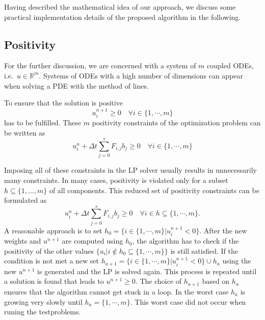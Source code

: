 \documentclass[a4paper]{article}
\numberwithin{equation}{section}
\theoremstyle{plain}
\theoremstyle{definition}
\numberwithin{theorem}{section}
\newcommand{\R}{\mathbb{R}}
\newcommand{\dt}{{\Delta t}}
\newcommand{\1}{\mathbbm{1}}
\begin{document}
Having described the mathematical idea of our approach,
we discuss some practical implementation details of the
proposed algorithm in the following.


\subsection{Positivity}

For the further discussion, we are concerned with a system of
$m$ coupled ODEs, i.e.\ $u \in \R^m$.
Systems of ODEs with a high number of dimensions can appear when solving a PDE with the method of lines.

To ensure that the solution is positive
\begin{equation}
 u_i^{n+1} \geq 0   \quad   \forall {i \in \{1, \cdots,m \}}  
\end{equation}
has to be fulfilled. These $m$ positivity constraints of the
optimization problem can be written as
\begin{equation}
u_i^n + \dt \sum_{j=0}^s F_{i,j}  b_j \geq 0 \quad \forall {i \in \{1, \cdots,m \}}
\end{equation}

Imposing all of these constraints in the LP solver usually results
in unnecessarily many constraints. In many cases, positivity is
violated only for a subset $h \subseteq \{1, \dots, m\}$ of all
components. This reduced set of positivity constraints can be
formulated as
\begin{equation}
u_i^n + \dt \sum_{j=0}^s F_{i,j}  b_j  \geq 0 \quad \forall i \in h \subseteq \{1,\cdots,m \}.
\end{equation}
A reasonable approach is to set $h_0 = \{ i \in \{1,\cdots,m \} |  u_i^{n+1}  < 0 \}$. 
After the new weights and $u^{n+1}$ are computed using $h_0$, the algorithm has to check if the positivity of the other values $\{u_i | i \notin h_0 \subseteq \{1,\cdots,m \}\}$ is still satisfied.
If the condition is not met a new set $h_{a+1} = \{ i \in \{1,\cdots,m \}|  u_i^{n+1}  < 0 \} \cup h_{a}$ using the new $u^{n+1}$ is generated and the LP is solved again. This process is repeated until a solution is found that leads to $u^{n+1} \geq 0$. The choice of $h_{a+1}$ based on $h_{a}$ ensures that the algorithm cannot get stuck in a loop. In the worst case $h_a$ is growing very slowly until $h_a = \{1,\cdots,m \}$.
This worst case did not occur when runing the testproblems. 
\end{document}

